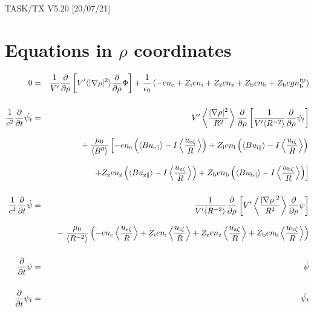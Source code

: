 \documentclass[11pt]{article}
\def\r#1{{\rm#1}}
\def\ave#1{\left\langle#1\right\rangle}
\def\aves#1{\langle#1\rangle}
\def\para{\parallel}
\def\ddrho{\frac{\partial}{\partial\rho}}
\def\ddt{\frac{\partial}{\partial t}}
\def\gradrho2{\aves{|\nabla\rho|^2}}
\def\psid{\dot{\psi}}
\def\psit{\psi_t}
\def\psitd{\dot{\psit}}
\def\nee{n_\r{e}}
\def\ni{n_\r{i}}
\def\nz{n_\r{z}}
\def\nb{n_\r{b}}
\def\Zi{Z_\r{i}}
\def\Zz{Z_\r{z}}
\def\Zb{Z_\r{b}}
\def\uzt#1{u_{\r{#1}\zeta}}
\def\upara#1{u_{\r{#1}\para}}
\def\nbrp{n_\r{b}^\r{rp}}
\begin{document}
\begin{center}
TASK/TX V5.20 [20/07/21]
\end{center}

\section{Equations in $\rho$ coordinates}
\vspace{-5mm}

%
\begin{eqnarray}
  0 &=&
%
    \frac{1}{V'} \ddrho \left[ V' \gradrho2 \ddrho{\Phi} \right]
%
  + \frac{1}{\epsilon_0}
%
    \left(-e \nee + \Zi e \ni + \Zz e \nz + \Zb e \nb + \Zb e g \nbrp \right)
\\[5mm]
  \frac{1}{c^2} \ddt \psitd &=&
%
    V' \ave{\frac{|\nabla\rho|^2}{R^2}} \ddrho \left[ \frac{1}{V'\aves{R^{-2}}}
				         \ddrho \psit \right] \nonumber\\[3mm]&&{}
%
  + \frac{\mu_0}{\aves{B^\theta}}
%
    \left[-     e \nee \left( \aves{B\upara{e}} - I\ave{\frac{\uzt{e}}{R}} \right)
          + \Zi e \ni  \left( \aves{B\upara{i}} - I\ave{\frac{\uzt{i}}{R}} \right)
    \right.\nonumber\\[3mm]&&{}
    \left.+ \Zz e \nz  \left( \aves{B\upara{z}} - I\ave{\frac{\uzt{z}}{R}} \right)
          + \Zb e \nb  \left( \aves{B\upara{b}} - I\ave{\frac{\uzt{b}}{R}} \right) \right]
\\[5mm]
  \frac{1}{c^2} \ddt \psid &=&
%
  \frac{1}{V'\aves{R^{-2}}} \ddrho \left[ V'
				    \ave{\frac{|\nabla\rho|^2}{R^2}}
				    \ddrho \psi \right] \nonumber\\[3mm]&&{}
%
  - \frac{\mu_0}{\aves{R^{-2}}} \left(-e \nee \ave{\frac{\uzt{e}}{R}}
			         + \Zi e \ni  \ave{\frac{\uzt{i}}{R}}
			         + \Zz e \nz  \ave{\frac{\uzt{z}}{R}}
			         + \Zb e \nb  \ave{\frac{\uzt{b}}{R}} \right)
%
\\[5mm]
  \ddt \psi &=&
%
  \psid
\\[5mm]
  \ddt \psit &=&
%
  \psitd
\end{eqnarray}
%

\end{document}
